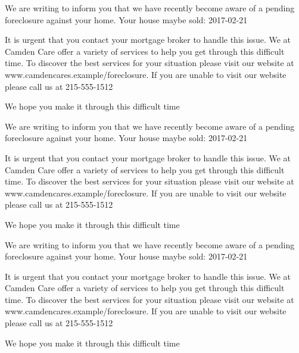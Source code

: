 \documentclass[10pt,stdletter]{newlfm}
\begin{document}
\pagebreak
{}
\begin{newlfm}

We are writing to inform you that we have recently become aware of a pending foreclosure against your home. Your house maybe sold: 2017-02-21

It is urgent that you contact your mortgage broker to handle this issue.
We at Camden Care offer a variety of services to help you get through this difficult time. To discover the best services for your situation please visit our website at www.camdencares.example/foreclosure.
If you are unable to visit our website please call us at 215-555-1512

We hope you make it through this difficult time

\end{newlfm}
\pagebreak
{}
\begin{newlfm}

We are writing to inform you that we have recently become aware of a pending foreclosure against your home. Your house maybe sold: 2017-02-21

It is urgent that you contact your mortgage broker to handle this issue.
We at Camden Care offer a variety of services to help you get through this difficult time. To discover the best services for your situation please visit our website at www.camdencares.example/foreclosure.
If you are unable to visit our website please call us at 215-555-1512

We hope you make it through this difficult time

\end{newlfm}
\pagebreak
{}
\begin{newlfm}

We are writing to inform you that we have recently become aware of a pending foreclosure against your home. Your house maybe sold: 2017-02-21

It is urgent that you contact your mortgage broker to handle this issue.
We at Camden Care offer a variety of services to help you get through this difficult time. To discover the best services for your situation please visit our website at www.camdencares.example/foreclosure.
If you are unable to visit our website please call us at 215-555-1512

We hope you make it through this difficult time

\end{newlfm}
\end{document}
